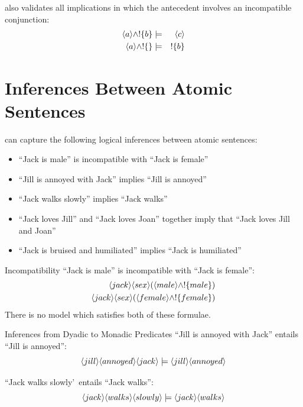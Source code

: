 \begin{frame}
\Cathoristic{} also validates all implications in which the antecedent involves an incompatible conjunction:
\begin{eqnarray*}
\langle a \rangle \land ! \{b\} & \models & \langle c \rangle \\
\langle a \rangle \land ! \{\} & \models & ! \{b\}
\end{eqnarray*}
\end{frame}

\section{Inferences Between Atomic Sentences}

\begin{frame}
\Cathoristic{} can capture the following logical inferences between atomic sentences:
\begin{itemize}
\item
``Jack is male'' is incompatible with ``Jack is female''
\item
``Jill is annoyed with Jack'' implies ``Jill is annoyed''
\item
``Jack walks slowly'' implies ``Jack walks''
\item
``Jack loves Jill''  and ``Jack loves Joan'' together imply that ``Jack loves Jill and Joan''
\item
``Jack is bruised and humiliated'' implies ``Jack is humiliated''
\end{itemize}
\end{frame}

\begin{frame}{Incompatibility}
``Jack is male'' is incompatible with ``Jack is female'':
\begin{eqnarray*}
\langle jack \rangle \langle sex \rangle (\langle male \rangle \land ! \{male\}) \\
\langle jack \rangle \langle sex \rangle (\langle female \rangle \land ! \{female\})
\end{eqnarray*}
There is no model which satisfies both of these formulae.
\end{frame}

\begin{frame}{Inferences from Dyadic to Monadic Predicates}
``Jill is annoyed with Jack'' entails ``Jill is annoyed'':
\[
\langle jill \rangle \langle annoyed \rangle \langle jack \rangle \models \langle jill \rangle \langle annoyed \rangle \]
\end{frame}

\begin{frame}
``Jack walks slowly'\ entails ``Jack walks'':
\[
\langle jack \rangle \langle walks \rangle \langle slowly \rangle \models \langle jack \rangle \langle walks \rangle \]
\end{frame}

